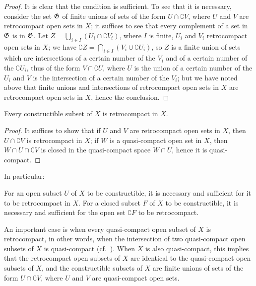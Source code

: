 \begin{proof}
\label{proof-0.9.1.3}
It is clear that the condition is sufficient.
To see that it is necessary, consider the set $\mathfrak{G}$ of finite unions of sets of the form $U\cap\complement{V}$, where $U$ and $V$ are retrocompact open sets in $X$; it suffices to see that every complement of a set in $\mathfrak{G}$ is in $\mathfrak{G}$.
Let $Z=\bigcup_{i\in I}(U_i\cap\complement{V_i})$, where $I$ is finite, $U_i$ and $V_i$ retrocompact open sets in $X$; we have
$\complement{Z}=\bigcap_{i\in I}(V_i\cup\complement{U_i})$, so $Z$ is a finite union of sets which are intersections of a certain number of the $V_i$ and of a certain number of the $\complement{U_i}$, thus of the form
$V\cap\complement{U}$, where $U$ is the union of a certain number of the $U_i$ and $V$ is the intersection of a certain number of the $V_i$; but we have noted above that finite unions and intersections of retrocompact open sets in $X$ are retrocompact open sets in $X$, hence the conclusion.
\end{proof}

\begin{cor}[9.1.4]
\label{0.9.1.4}
Every constructible subset of $X$ is retrocompact in $X$.
\end{cor}

\begin{proof}
\label{proof-0.9.1.4}
It suffices to show that if $U$ and $V$ are retrocompact open sets in $X$, then $U\cap\complement{V}$ is retrocompact in $X$; if $W$ is a quasi-compact open set in $X$, then $W\cap U\cap\complement{V}$ is closed in the quasi-compact space $W\cap U$, hence it is quasi-compact.
\end{proof}

In particular:
\begin{cor}[9.1.5]
\label{0.9.1.5}
For an open subset $U$ of $X$ to be constructible, it is necessary and sufficient for it to be retrocompact in $X$.
For a closed subset $F$ of $X$ to be constructible, it is necessary and sufficient for the open set $\complement{F}$ to be retrocompact.
\end{cor}

\begin{env}[9.1.6]
\label{0.9.1.6}
An important case is when every quasi-compact open subset of $X$ is retrocompact, in other words, when the intersection of two quasi-compact open subsets of $X$ is quasi-compact (cf.~).
When $X$ is also quasi-compact, this implies that the retrocompact open subsets of $X$ are identical to the quasi-compact open subsets of $X$, and the constructible subsets of $X$ are finite unions of sets of the form $U\cap\complement{V}$, where $U$ and $V$ are quasi-compact open sets.
\end{env}

